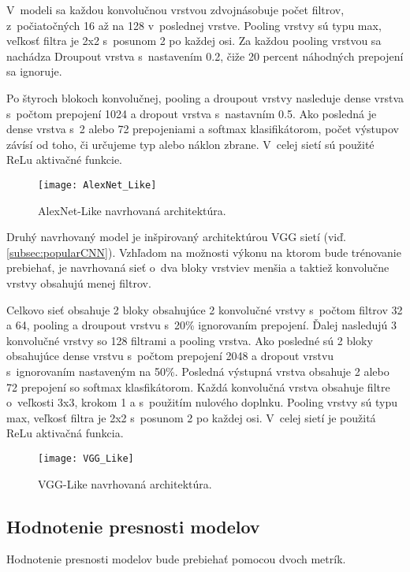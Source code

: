 V~modeli sa každou konvolučnou vrstvou zdvojnásobuje počet filtrov, z~počiatočných 16 až na 128 v~poslednej vrstve.
Pooling vrstvy sú typu max, veľkosť filtra je 2x2 s~posunom 2 po každej osi.
Za každou pooling vrstvou sa nachádza Droupout vrstva s~nastavením 0.2, čiže 20 percent náhodných prepojení sa ignoruje.

Po štyroch blokoch konvolučnej, pooling a droupout vrstvy nasleduje dense vrstva s~počtom prepojení 1024 a dropout vrstva s~nastavním 0.5.
Ako posledná je dense vrstva s~2 alebo 72 prepojeniami a softmax klasifikátorom, počet výstupov závísí od toho, či určujeme typ alebo náklon zbrane.
V~celej sietí sú použité ReLu aktivačné funkcie.

\begin{figure}[H]
    \centering
    \texttt{[image: AlexNet\_Like]}
    \caption{AlexNet-Like navrhovaná architektúra.}
    \label{pic:kNN}
\end{figure}


Druhý navrhovaný model je inšpirovaný architektúrou VGG sietí (viď. \ref{subsec:popularCNN}).
Vzhľadom na možnosti výkonu na ktorom bude trénovanie prebiehať, je navrhovaná sieť o~dva bloky vrstviev menšia a taktiež konvolučne vrstvy obsahujú menej filtrov.

Celkovo sieť obsahuje 2 bloky obsahujúce 2 konvolučné vrstvy s~počtom filtrov 32 a 64, pooling a droupout vrstvu s~20\% ignorovaním prepojení.
Ďalej nasledujú 3 konvolučné vrstvy so 128 filtrami a pooling vrstva.
Ako posledné sú 2 bloky obsahujúce dense vrstvu s~počtom prepojení 2048 a dropout vrstvu s~ignorovaním nastaveným na 50\%.
Posledná výstupná vrstva obsahuje 2 alebo 72 prepojení so softmax klasfikátorom.
Každá konvolučná vrstva obsahuje filtre o~veľkosti 3x3, krokom 1 a s~použitím nulového doplnku.
Pooling vrstvy sú typu max, veľkosť filtra je 2x2 s~posunom 2 po každej osi.
V~celej sietí je použitá ReLu aktivačná funkcia.

\begin{figure}[H]
    \centering
    \texttt{[image: VGG\_Like]}
    \caption{VGG-Like navrhovaná architektúra.}
    \label{pic:kNN}
\end{figure}

\subsection{Hodnotenie presnosti modelov}
\label{subsec:hodnoteniepresnosti}
Hodnotenie presnosti modelov bude prebiehať pomocou dvoch metrík.

